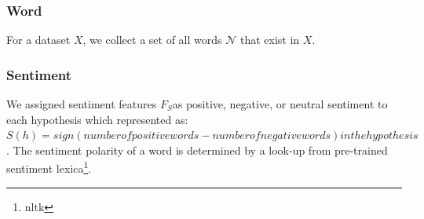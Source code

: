 \subsubsection{Word} For a dataset $X$, 
we collect a set of all words $\mathcal{N}$ that exist in $X$. 




%

\subsubsection{Sentiment}

We assigned sentiment features $F_{S}$as 
positive, negative, or neutral sentiment to each hypothesis which 
represented as: 
$S(h) = sign(number of positive words - number of negative words) in the hypothesis$.
The sentiment polarity of a word
is determined by a look-up from pre-trained
sentiment lexica\footnote{nltk}. 

